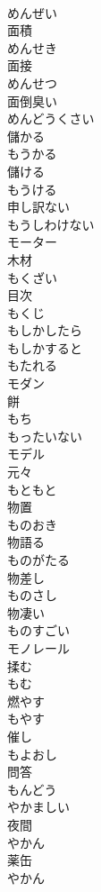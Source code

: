 \documentclass[8pt]{extreport}
\begin{document}
\begin{CJK}{UTF8}{min}
\\	めんぜい	
\\	面積 
\\	めんせき	
\\	面接 
\\	めんせつ	
\\	面倒臭い 
\\	めんどうくさい	
\\	儲かる 
\\	もうかる	
\\	儲ける 
\\	もうける	
\\	申し訳ない 
\\	もうしわけない	
\\	モーター	
\\	木材 
\\	もくざい	
\\	目次 
\\	もくじ	
\\	もしかしたら	
\\	もしかすると	
\\	もたれる	
\\	モダン	
\\	餅 
\\	もち	
\\	もったいない	
\\	モデル	
\\	元々 
\\	もともと	
\\	物置 
\\	ものおき	
\\	物語る 
\\	ものがたる	
\\	物差し 
\\	ものさし	
\\	物凄い 
\\	ものすごい	
\\	モノレール	
\\	揉む 
\\	もむ	
\\	燃やす 
\\	もやす	
\\	催し 
\\	もよおし	
\\	問答 
\\	もんどう	
\\	やかましい	
\\	夜間 
\\	やかん	
\\	薬缶 
\\	やかん	

\end{CJK}
\end{document}
